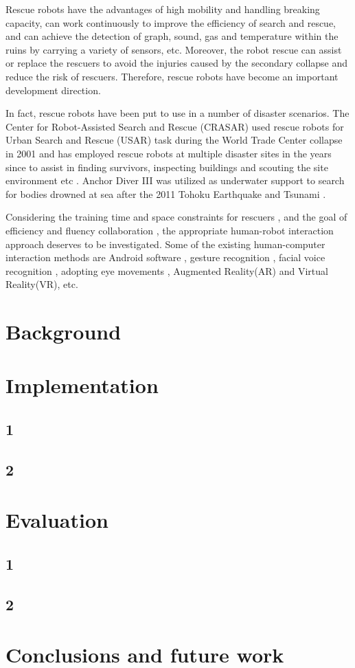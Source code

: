 \documentclass[
	ngerman,
	ruledheaders=section,%
	class=report,%
	thesis={type=bachelor},%
	accentcolor=9c,%
	custommargins=true,%
	marginpar=false,%
	parskip=half-,%
	fontsize=11pt,%
]{tudapub}
\begin{document}
Rescue robots have the advantages of high mobility and handling breaking capacity, can work continuously to improve the efficiency of search and rescue, and can achieve the detection of graph, sound, gas and temperature within the ruins by carrying a variety of sensors, etc.
Moreover, the robot rescue can assist or replace the rescuers to avoid the injuries caused by the secondary collapse and reduce the risk of rescuers. Therefore, rescue robots have become an important development direction.

In fact, rescue robots have been put to use in a number of disaster scenarios. The Center for Robot-Assisted Search and Rescue (CRASAR) used rescue robots for Urban Search and Rescue (USAR) task during the World Trade Center collapse in 2001 \cite{Casper:2003tk} and has employed rescue robots at multiple disaster sites in the years since to assist in finding survivors, inspecting buildings and scouting the site environment etc \cite{Murphy:2012th}. Anchor Diver III was utilized as underwater support to search for bodies drowned at sea after the 2011 Tohoku Earthquake and Tsunami \cite{Huang:2011wq}.

Considering the training time and space constraints for rescuers \cite{Murphy:2004wl}, and the goal of eﬃciency and ﬂuency collaboration \cite{10.1145/1228716.1228718}, the appropriate human-robot interaction approach deserves to be investigated. Some of the existing human-computer interaction methods are Android software \cite{Sarkar:2017tt} \cite{Faisal:2019uu}, gesture recognition\cite{Sousa:2017tn} \cite{10.1145/2157689.2157818} \cite{Nagi:2014vu}, facial voice recognition \cite{Pourmehr:2013ta}, adopting eye movements \cite{Ma:2015wu}, Augmented Reality(AR)\cite{SOARES20151656} and Virtual Reality(VR), etc.


\chapter{Background}

\chapter{Implementation}
\section{1}
\section{2}

\chapter{Evaluation}
\section{1}
\section{2}

\chapter{Conclusions and future work}


\printbibliography
\end{document}
